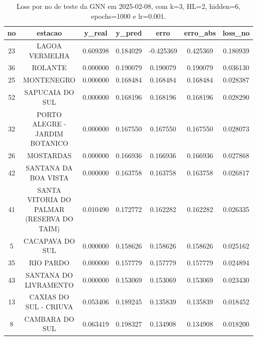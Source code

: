\begin{table}[h]
\centering
\caption{Loss por no de teste da GNN em 2025-02-08, com k=3, HL=2, hidden=6, epochs=1000 e lr=0.001.}
\label{tab:gnn_loss_k3_hl2_h6_e1000_d20250208}
\begin{tabular}{ccccccc}
\toprule
no & estacao & y\_real & y\_pred & erro & erro\_abs & loss\_no \\
\midrule
23 & LAGOA VERMELHA & 0.609398 & 0.184029 & -0.425369 & 0.425369 & 0.180939 \\
36 & ROLANTE & 0.000000 & 0.190079 & 0.190079 & 0.190079 & 0.036130 \\
25 & MONTENEGRO & 0.000000 & 0.168484 & 0.168484 & 0.168484 & 0.028387 \\
52 & SAPUCAIA DO SUL & 0.000000 & 0.168196 & 0.168196 & 0.168196 & 0.028290 \\
32 & PORTO ALEGRE - JARDIM BOTANICO & 0.000000 & 0.167550 & 0.167550 & 0.167550 & 0.028073 \\
26 & MOSTARDAS & 0.000000 & 0.166936 & 0.166936 & 0.166936 & 0.027868 \\
42 & SANTANA DA BOA VISTA & 0.000000 & 0.163758 & 0.163758 & 0.163758 & 0.026817 \\
41 & SANTA VITORIA DO PALMAR (RESERVA DO TAIM) & 0.010490 & 0.172772 & 0.162282 & 0.162282 & 0.026335 \\
5 & CACAPAVA DO SUL & 0.000000 & 0.158626 & 0.158626 & 0.158626 & 0.025162 \\
35 & RIO PARDO & 0.000000 & 0.157779 & 0.157779 & 0.157779 & 0.024894 \\
43 & SANTANA DO LIVRAMENTO & 0.000000 & 0.153069 & 0.153069 & 0.153069 & 0.023430 \\
13 & CAXIAS DO SUL - CRIUVA & 0.053406 & 0.189245 & 0.135839 & 0.135839 & 0.018452 \\
8 & CAMBARA DO SUL & 0.063419 & 0.198327 & 0.134908 & 0.134908 & 0.018200 \\
\bottomrule
\end{tabular}
\end{table}
